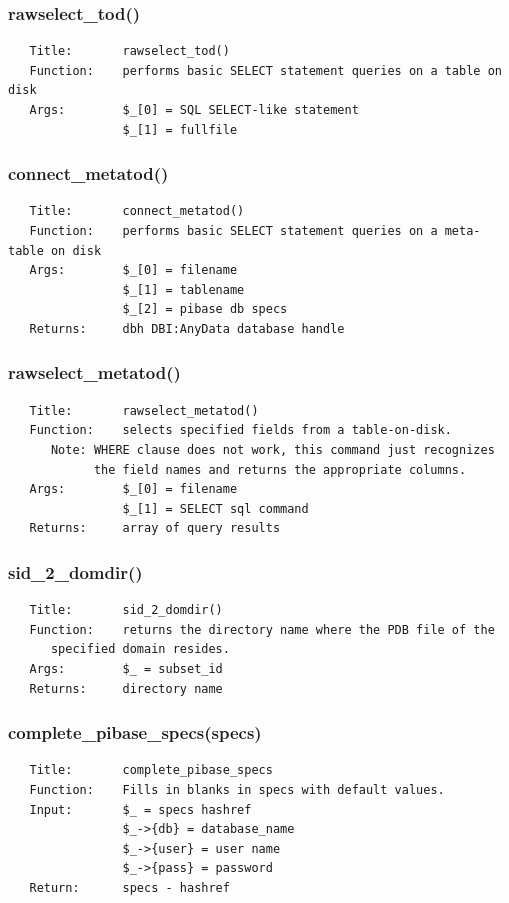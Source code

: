 \documentclass{article}
\begin{document}
\subsubsection*{rawselect\_tod()\label{pibase_pm_rawselect_tod_}}
\begin{verbatim}
   Title:       rawselect_tod()
   Function:    performs basic SELECT statement queries on a table on disk
   Args:        $_[0] = SQL SELECT-like statement
                $_[1] = fullfile
\end{verbatim}
\subsubsection*{connect\_metatod()\label{pibase_pm_connect_metatod_}}
\begin{verbatim}
   Title:       connect_metatod()
   Function:    performs basic SELECT statement queries on a meta-table on disk
   Args:        $_[0] = filename
                $_[1] = tablename
                $_[2] = pibase db specs
   Returns:     dbh DBI:AnyData database handle
\end{verbatim}
\subsubsection*{rawselect\_metatod()\label{pibase_pm_rawselect_metatod_}}
\begin{verbatim}
   Title:       rawselect_metatod()
   Function:    selects specified fields from a table-on-disk.
      Note: WHERE clause does not work, this command just recognizes
            the field names and returns the appropriate columns.
   Args:        $_[0] = filename
                $_[1] = SELECT sql command
   Returns:     array of query results
\end{verbatim}
\subsubsection*{sid\_2\_domdir()\label{pibase_pm_sid_2_domdir_}}
\begin{verbatim}
   Title:       sid_2_domdir()
   Function:    returns the directory name where the PDB file of the
      specified domain resides.
   Args:        $_ = subset_id
   Returns:     directory name
\end{verbatim}
\subsubsection*{complete\_pibase\_specs(specs)\label{pibase_pm_complete_pibase_specs_specs_}}
\begin{verbatim}
   Title:       complete_pibase_specs
   Function:    Fills in blanks in specs with default values.
   Input:       $_ = specs hashref
                $_->{db} = database_name
                $_->{user} = user name
                $_->{pass} = password
   Return:      specs - hashref
\end{verbatim}
\end{document}
